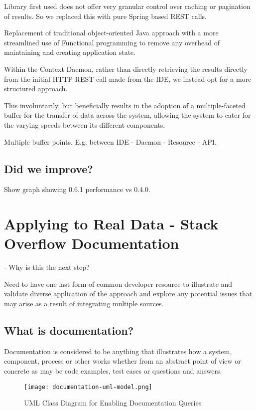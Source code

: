 Library first used does not offer very granular control over caching or pagination of results. So we replaced this with pure Spring based REST calls.

Replacement of traditional object-oriented Java approach with a more streamlined use of Functional programming to remove any overhead of maintaining and creating application state.

Within the Context Daemon, rather than directly retrieving the results directly from the initial HTTP REST call made from the IDE, we instead opt for a more structured approach.

This involuntarily, but beneficially results in the adoption of a multiple-faceted buffer for the transfer of data across the system, allowing the system to cater for the varying speeds between its different components.

Multiple buffer points. E.g. between IDE - Daemon - Resource - API.

\subsection{Did we improve?}

Show graph showing 0.6.1 performance vs 0.4.0.

\section{Applying to Real Data - Stack Overflow Documentation}

- Why is this the next step?

Need to have one last form of common developer resource to illustrate and validate diverse application of the approach and explore any potential issues that may arise as a result of integrating multiple sources.

\subsection{What is documentation?}

Documentation is considered to be anything that illustrates how a system, component, process or other works whether from an abstract point of view or concrete as may be code examples, test cases or questions and answers.

\begin{figure}[h!]
	\centering
	\texttt{[image: documentation-uml-model.png]}
	\label{fig:documentationUmlClass}
	\caption{UML Class Diagram for Enabling Documentation Queries}
\end{figure}


